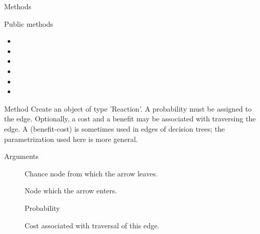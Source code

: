 \documentclass[a4paper]{book}
\begin{document}
\begin{Section}{Methods}
%
\begin{SubSection}{Public methods}
\begin{itemize}

\item{} 
\item{} 
\item{} 
\item{} 
\item{} 
\item{} 

\end{itemize}

\end{SubSection}




\hypertarget{method-new}{}
%
\begin{SubSection}{Method }
Create an object of type 'Reaction'. A probability must be assigned
to the edge. Optionally, a cost and a benefit may be associated
with traversing the edge. A  (benefit-cost) is sometimes
used in edges of decision trees; the parametrization used here is more
general.
%


%
\begin{SubSubSection}{Arguments}

\begin{description}

\item[] Chance node from which the arrow leaves.

\item[] Node which the arrow enters.

\item[] Probability

\item[] Cost associated with traversal of this edge.


\end{description}
\end{SubSubSection}
\end{SubSection}
\end{Section}
\end{document}
